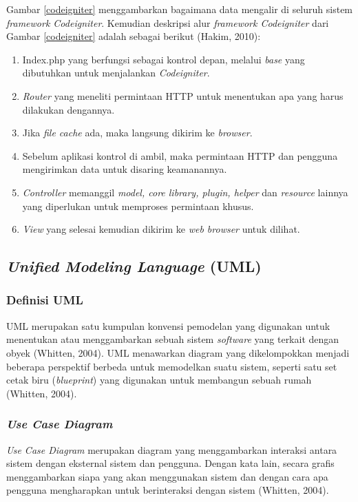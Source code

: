     Gambar \ref{codeigniter} menggambarkan bagaimana data mengalir di seluruh sistem \emph{framework Codeigniter}. Kemudian deskripsi alur \emph{framework Codeigniter} dari Gambar \ref{codeigniter} adalah sebagai berikut (Hakim, 2010):
    \begin{enumerate}
      \itemsep0em
      \item Index.php yang berfungsi sebagai kontrol depan, melalui \emph{base} yang dibutuhkan untuk menjalankan \emph{Codeigniter}.
      \item \emph{Router} yang meneliti permintaan HTTP untuk menentukan apa yang harus dilakukan dengannya.
      \item Jika \emph{file cache} ada, maka langsung dikirim ke \emph{browser}.
      \item Sebelum aplikasi kontrol di ambil, maka permintaan HTTP dan pengguna mengirimkan data untuk disaring keamanannya.
      \item \emph{Controller} memanggil \emph{model, core library, plugin, helper} dan \emph{resource} lainnya yang diperlukan untuk memproses permintaan khusus.
      \item \emph{View} yang selesai kemudian dikirim ke \emph{web browser} untuk dilihat.
    \end{enumerate}

  \subsection{\emph{Unified Modeling Language} (UML)}
    \subsubsection{Definisi UML}
    UML merupakan satu kumpulan konvensi pemodelan yang digunakan untuk menentukan atau menggambarkan sebuah sistem \emph{software} yang terkait dengan obyek (Whitten, 2004). UML menawarkan diagram yang dikelompokkan menjadi beberapa perspektif berbeda untuk memodelkan suatu sistem, seperti satu set cetak biru (\emph{blueprint}) yang digunakan untuk membangun sebuah rumah (Whitten, 2004).

    \subsubsection{\emph{Use Case Diagram}}
    \emph{Use Case Diagram} merupakan diagram yang menggambarkan interaksi antara sistem dengan eksternal sistem dan pengguna. Dengan kata lain, secara grafis menggambarkan siapa yang akan menggunakan sistem dan dengan cara apa pengguna mengharapkan untuk berinteraksi dengan sistem (Whitten, 2004).


